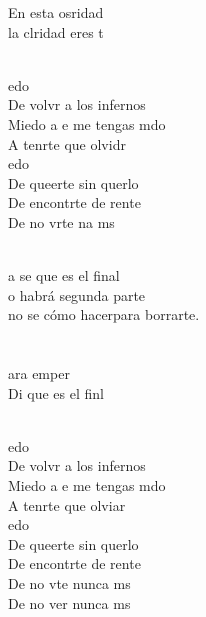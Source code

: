 \begin{cancion}[Miedo][M Clan]
	En esta osridad \\
	la clridad eres t         \\\jump\\
	\begin{chorus}%
	edo\\
	De volvr a los infernos\\
	Miedo a e me tengas mdo\\
	A tenrte que olvidr      \\
	edo\\
	De queerte sin querlo\\
	De encontrte de rente\\
	De no vrte na ms\\
	\end{chorus}%
	\jump\\
	a se que es el final\\
	o habrá segunda parte\\
	 no se cómo hacerpara borrarte.\\
\jump\\
	     \\
	ara emper\\
	Di que es el finl \\\jump\\
	\begin{chorus}%
	edo\\
	De volvr a los infernos\\
	Miedo a e me tengas mdo\\
	A tenrte que olviar     \\
	edo\\
	De queerte sin querlo\\
	De encontrte de rente\\
	De no vte nunca ms         \\
	De no ver nunca ms         \\

\end{chorus}
\end{cancion}
